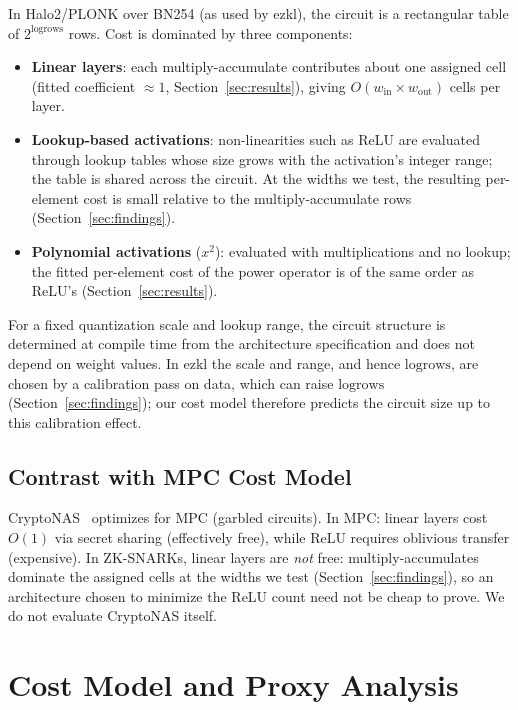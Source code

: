 \documentclass[10pt]{article}
\newcommand{\logrows}{\mathrm{logrows}}
\begin{document}
In Halo2/PLONK over BN254 (as used by ezkl), the circuit is a rectangular
table of $2^{\logrows}$ rows.  Cost is dominated by three components:
\begin{itemize}
  \item \textbf{Linear layers}: each multiply-accumulate contributes about one
    assigned cell (fitted coefficient $\approx1$, Section~\ref{sec:results}), giving
    $O(w_{\mathrm{in}} \times w_{\mathrm{out}})$ cells per layer.
  \item \textbf{Lookup-based activations}: non-linearities such as ReLU are
    evaluated through lookup tables whose size grows with the activation's integer
    range; the table is shared across the circuit.  At the widths we test, the
    resulting per-element cost is small relative to the multiply-accumulate rows
    (Section~\ref{sec:findings}).
  \item \textbf{Polynomial activations} ($x^2$): evaluated with multiplications and no lookup;
    the fitted per-element cost of the power operator is of the same order as ReLU's
    (Section~\ref{sec:results}).
\end{itemize}
For a fixed quantization scale and lookup range, the circuit structure is
determined at compile time from the architecture specification and does not
depend on weight values.  In ezkl the scale and range, and hence $\logrows$,
are chosen by a calibration pass on data, which can raise $\logrows$ (Section~\ref{sec:findings});
our cost model therefore predicts the circuit size up to this calibration effect.

\subsection{Contrast with MPC Cost Model}

CryptoNAS~\citep{ghodsi2020cryptonas} optimizes for MPC (garbled circuits).
In MPC: linear layers cost $O(1)$ via secret sharing (effectively free), while
ReLU requires oblivious transfer (expensive).  In ZK-SNARKs, linear layers are
\emph{not} free: multiply-accumulates dominate the assigned cells at the widths we test
(Section~\ref{sec:findings}), so an architecture chosen to minimize the ReLU count need not be cheap to prove.
We do not evaluate CryptoNAS itself.


\section{Cost Model and Proxy Analysis}
\label{sec:theory}
\end{document}
